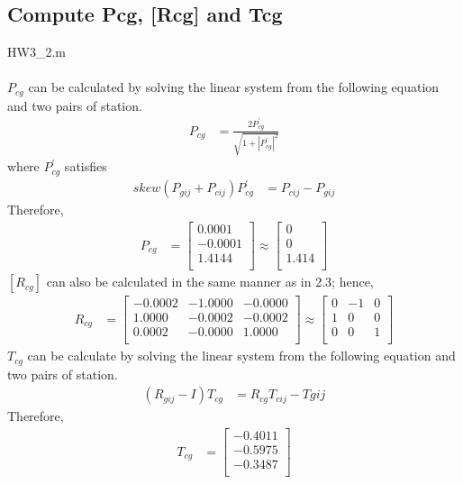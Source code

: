 \documentclass[]{article}
\begin{document}
\subsection{Compute Pcg, [Rcg] and Tcg}
HW3\_2.m\\
\\
\indent $P_{cg}$ can be calculated by solving the linear system from the following equation and two pairs of station.
\begin{align*}
P_{cg} &= \frac{2P_{cg}^{'}}{\sqrt{1+|P_{cg}^{'}|^2}}
\end{align*}
\indent where $P_{cg}^{'}$ satisfies
\begin{align*} 
skew(P_{gij}+P_{cij})P_{cg}^{'} &= P_{cij}-P_{gij}
\end{align*}
\indent Therefore,
\begin{align*}
P_{cg} &=
\begin{bmatrix}
0.0001\\
-0.0001\\
1.4144\\
\end{bmatrix}\approx 
\begin{bmatrix}
0\\
0\\
1.414\\
\end{bmatrix}
\end{align*}
\indent $[R_{cg}]$ can also be calculated in the same manner as in 2.3; hence,
\begin{align*}
R_{cg} &=
\begin{bmatrix}
-0.0002 & -1.0000 & -0.0000\\
1.0000  & -0.0002 & -0.0002\\
0.0002  & -0.0000 &  1.0000\\
\end{bmatrix}\approx 
\begin{bmatrix}
0 & -1 & 0\\
1 & 0 & 0\\
0 & 0 & 1\\
\end{bmatrix}
\end{align*}
\indent $T_{cg}$ can be calculate by solving the linear system from the following equation and two pairs of station.
\begin{align*} 
(R_{gij}-I)T_{cg} &= R_{cg}T_{cij}-T{gij}
\end{align*}
\indent Therefore,
\begin{align*}
T_{cg} &=
\begin{bmatrix}
-0.4011\\
-0.5975\\
-0.3487\\
\end{bmatrix}
\end{align*}
\end{document}
